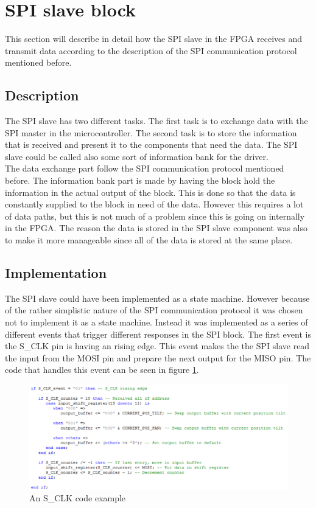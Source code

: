 \section{SPI slave block}

This section will describe in detail how the SPI slave in the FPGA receives and transmit data according to the description of the SPI communication protocol mentioned before.

\subsection{Description}

The SPI slave has two different tasks. The first task is to exchange data with the SPI master in the microcontroller. The second task is to store the information that is received and present it to the components that need the data. The SPI slave could be called also some sort of information bank for the driver.\\
The data exchange part follow the SPI communication protocol mentioned before.
The information bank part is made by having the block hold the information in the actual output of the block. This is done so that the data is constantly supplied to the block in need of the data. However this requires a lot of data paths, but this is not much of a problem since this is going on internally in the FPGA. The reason the data is stored in the SPI slave component was also to make it more manageable since all of the data is stored at the same place.

\subsection{Implementation}

The SPI slave could have been implemented as a state machine. However because of  the rather simplistic nature of the SPI communication protocol it was chosen not to implement it as a state machine. Instead it was implemented as a series of different events that trigger different responses in the SPI block. The first event is the S\_CLK pin is having an rising edge. This event makes the the SPI slave read the input from the MOSI pin and prepare the next output for the MISO pin. The code that handles this event can be seen in figure \ref{fig:S_CLK_code_example}. 

\begin{figure}[h!]
\centering
\includegraphics[scale=0.5]{Billeder/FPGA/SPI_Slave/S_CLK_code_example.png}
\caption{ An S\_CLK code example }
\label{fig:S_CLK_code_example}
\end{figure}

